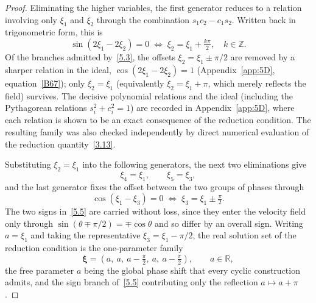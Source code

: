 \documentclass[11pt]{jfm}
\numberwithin{equation}{section}
\begin{document}
\begin{proof}
Eliminating the higher variables, the first generator reduces to a relation involving only
$\xi_1$ and $\xi_2$ through the combination $s_1c_2-c_1s_2$. Written back in trigonometric form,
this is
\begin{equation}
\label{5.3}
\sin(2\xi_1-2\xi_2)=0 \;\Longleftrightarrow\; \xi_2=\xi_1+\tfrac{k\pi}{2}, \quad k\in\mathbb{Z}.
\end{equation}
Of the branches admitted by~\eqref{5.3}, the offsets $\xi_2=\xi_1\pm\pi/2$ are removed by a
sharper relation in the ideal, $\cos(2\xi_1-2\xi_2)=1$ (Appendix~\ref{app:5D},
equation~\eqref{B67}); only $\xi_2=\xi_1$ (equivalently
$\xi_2=\xi_1+\pi$, which merely reflects the field) survives. The decisive polynomial relations
and the ideal (including the Pythagorean relations $s_i^2+c_i^2=1$) are recorded in
Appendix~\ref{app:5D}, where each relation is shown to be an exact consequence of the reduction
condition. The resulting family was also checked independently by direct numerical evaluation of
the reduction quantity~\eqref{3.13}.

Substituting $\xi_2=\xi_1$ into the following generators, the next two eliminations give
\begin{equation}
\label{5.4}
\xi_4=\xi_1,\qquad \xi_5=\xi_3,
\end{equation}
and the last generator fixes the offset between the two groups of phases through
\begin{equation}
\label{5.5}
\cos(\xi_1-\xi_3)=0 \;\Longleftrightarrow\; \xi_3=\xi_1\pm\tfrac{\pi}{2}.
\end{equation}
The two signs in~\eqref{5.5} are carried without loss, since they enter the velocity field only
through $\sin(\theta\mp\pi/2)=\mp\cos\theta$ and so differ by an overall sign. Writing
$a=\xi_1$ and taking the representative $\xi_3=\xi_1-\pi/2$, the real solution set of the
reduction condition is the one-parameter family
\begin{equation}
\label{5.6}
\boldsymbol{\xi} = \left(a,\ a,\ a-\tfrac{\pi}{2},\ a,\ a-\tfrac{\pi}{2}\right),
\qquad a\in\mathbb{R},
\end{equation}
the free parameter $a$ being the global phase shift that every cyclic construction admits, and
the sign branch of~\eqref{5.5} contributing only the reflection $a\mapsto a+\pi$.


\end{proof}
\end{document}
